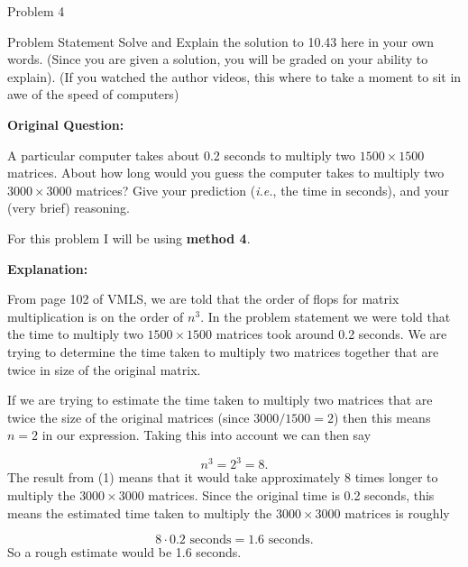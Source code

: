 \begin{problem}{Problem 4}
    \begin{statement}{Problem Statement}
        Solve and Explain the solution to 10.43 here in your own words. (Since you are given a solution, you will be graded on your ability to explain). (If you watched the author videos, this where 
        to take a moment to sit in awe of the speed of computers) \vspace*{1em}

        \noindent \textbf{Original Question:} \vspace*{1em}

        A particular computer takes about 0.2 seconds to multiply two $1500 \times 1500$ matrices. About how long would you guess the computer takes to multiply two $3000 \times 3000$ matrices? Give 
        your prediction (\textit{i.e.}, the time in seconds), and your (very brief) reasoning.
    \end{statement}

    \begin{highlight}[Solution]
        \noindent For this problem I will be using \textbf{method 4}. \vspace*{1em}

        \noindent \textbf{Explanation:} \vspace*{1em}

        From page 102 of VMLS, we are told that the order of flops for matrix multiplication is on the order of $n^{3}$. In the problem statement we were told that the time to multiply two $1500 \times 1500$
        matrices took around 0.2 seconds. We are trying to determine the time taken to multiply two matrices together that are twice in size of the original matrix. 

        If we are trying to estimate the time taken to multiply two matrices that are twice the size of the original matrices (since $3000 / 1500 = 2$) then this means $n = 2$ in our expression. Taking
        this into account we can then say 
        
        \setcounter{equation}{0}
        \begin{equation}
            n^{3} = 2^{3} = 8.
        \end{equation}
        The result from (1) means that it would take approximately 8 times longer to multiply the $3000 \times 3000$ matrices. Since the original time is 0.2 seconds, this means the estimated time 
        taken to multiply the $3000 \times 3000$ matrices is roughly

        \begin{equation}
            8\cdot 0.2 \text{ seconds} = 1.6 \text{ seconds}.
        \end{equation}
        So a rough estimate would be 1.6 seconds.
    \end{highlight}
\end{problem}


